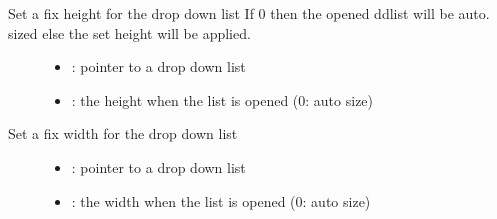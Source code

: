 \documentclass[letterpaper,10pt,english]{sphinxmanual}
\begin{document}

\begin{fulllineitems}
\label{\detokenize{object-types/ddlist:_CPPv424lv_ddlist_set_fix_heightP8lv_obj_t10lv_coord_t}}%
\pysigstartmultiline
{}\label{\detokenize{object-types/ddlist:lv__ddlist_8h_1aaf9e1d89ac74deff12aa08ddf62e70c2}}%
\pysigstopmultiline
Set a fix height for the drop down list If 0 then the opened ddlist will be auto. sized else the set height will be applied. \begin{description}
\item[{}] \leavevmode\begin{itemize}
\item {} 
: pointer to a drop down list 

\item {} 
: the height when the list is opened (0: auto size) 

\end{itemize}

\end{description}


\end{fulllineitems}


\begin{fulllineitems}
\label{\detokenize{object-types/ddlist:_CPPv423lv_ddlist_set_fix_widthP8lv_obj_t10lv_coord_t}}%
\pysigstartmultiline
{}\label{\detokenize{object-types/ddlist:lv__ddlist_8h_1ad9c641a41dff5e9a9fd2fbb4962b841d}}%
\pysigstopmultiline
Set a fix width for the drop down list \begin{description}
\item[{}] \leavevmode\begin{itemize}
\item {} 
: pointer to a drop down list 

\item {} 
: the width when the list is opened (0: auto size) 

\end{itemize}

\end{description}


\end{fulllineitems}
\end{document}
